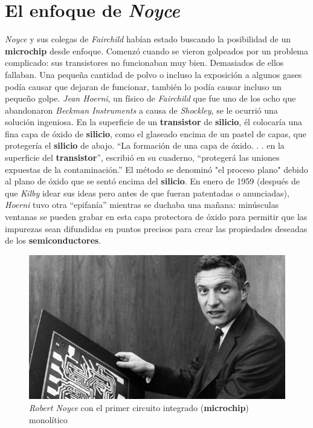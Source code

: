 \section{El enfoque de \emph{Noyce}}
\emph{Noyce} y sus colegas de \emph{Fairchild} habían estado buscando la posibilidad de un \textbf{microchip} desde enfoque. Comenzó cuando se vieron
golpeados por un problema complicado: sus transistores no funcionaban muy bien. Demasiados de ellos fallaban. Una pequeña cantidad de polvo
o incluso la exposición a algunos gases podía causar que dejaran de funcionar, también lo podía causar incluso un pequeño golpe. \emph{Jean Hoerni},
un físico de \emph{Fairchild} que fue uno de los ocho que abandonaron \emph{Beckman Instruments} a causa de \emph{Shockley}, se le ocurrió una solución
ingeniosa. En la superficie de un \textbf{transistor} de \textbf{silicio}, él colocaría una fina capa de óxido de \textbf{silicio}, como el glaseado
encima de un pastel de capas, que protegería el \textbf{silicio} de abajo. “La formación de una capa de óxido. . . en la superficie del \textbf{transistor}”,
escribió en su cuaderno, “protegerá las uniones expuestas de la contaminación.” El método se denominó "el proceso plano" debido al plano de óxido que se
sentó encima del \textbf{silicio}. En enero de 1959 (después de que \emph{Kilby} idear sus ideas pero antes de que fueran patentadas o anunciadas),
\emph{Hoerni} tuvo otra “epifanía” mientras se duchaba una mañana: minúsculas ventanas se pueden grabar en esta capa protectora de óxido para permitir
que las impurezas sean difundidas en puntos precisos para crear las propiedades deseadas de los \textbf{semiconductores}.  \\ 

\begin{figure}[htb]
	\centering
	\includegraphics[scale = 0.8]{Graphics/Robert_Noyce_with_first_monolithic_IC_1959.png}
	\caption{\emph{Robert Noyce} con el primer circuito integrado (\textbf{microchip}) monolítico}
	\label{fig:8}
\end{figure}

